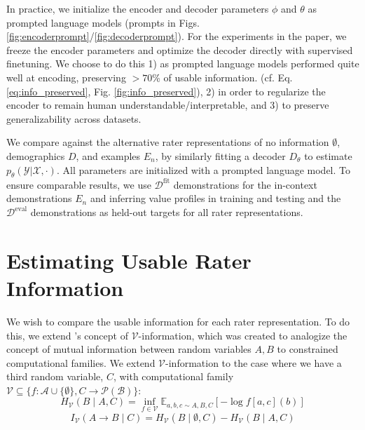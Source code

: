 \documentclass[11pt]{article}
\begin{document}
In practice, we initialize the encoder and decoder parameters $\phi$ and $\theta$ as prompted language models (prompts in Figs. \ref{fig:encoderprompt}/\ref{fig:decoderprompt}). For the experiments in the paper, we freeze the encoder parameters and optimize the decoder directly with supervised finetuning. We choose to do this 1) as prompted language models performed quite well at encoding, preserving $>70$\% of usable information. (cf. Eq. \ref{eq:info_preserved}, Fig. \ref{fig:info_preserved}), 2) in order to regularize the encoder to remain human understandable/interpretable, and 3) to preserve generalizability across datasets.

We compare against the alternative rater representations of no information $\emptyset$, demographics $D$, and examples $E_n$, by similarly fitting a decoder $D_\theta$ to estimate  $p_\theta(\mathcal{Y}|\mathcal{X}, \cdot)$. All parameters are initialized with a prompted language model. To ensure comparable results, we use $\mathcal{D}^{\textrm{fit}}$ demonstrations for the in-context demonstrations $E_n$ and inferring value profiles in training and testing and the $\mathcal{D}^\textrm{eval}$ demonstrations as held-out targets for all rater representations.

\section{Estimating Usable Rater Information}
\label{sec:informationmethodology}


We wish to compare the usable information for each rater representation. To do this, we extend \citet{xu2020theoryusableinformationcomputational}'s concept of  $\mathcal{V}$-information, which was created to analogize the concept of mutual information between random variables $A,B$ to constrained computational families. We extend $\mathcal{V}$-information to the case where we have a third random variable, $C$, with computational family $\mathcal{V} \subseteq \{f: \mathscr{A} \cup \{\emptyset\}, C \to \mathcal{P}(\mathscr{B})\}$:
\begin{equation}
H_\mathcal{V}(B \mid A, C) = \inf_{f \in \mathcal{V}} \mathbb{E}_{a,b,c \sim A,B,C} [-\log f[a,c](b)]
\end{equation}
\begin{equation}
I_\mathcal{V}(A \to B \mid C) = H_\mathcal{V}(B \mid \emptyset, C) - H_\mathcal{V}(B \mid A, C)
\end{equation}
\end{document}
